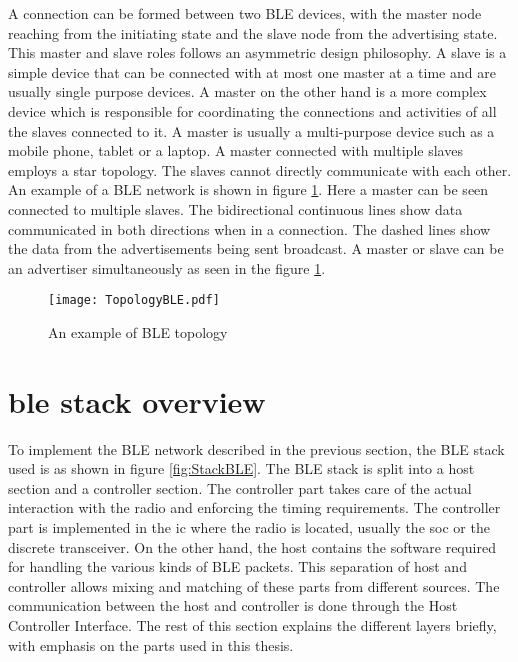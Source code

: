 A connection can be formed between two BLE devices, with the master node reaching from the initiating state and the slave node from the advertising state. This master and slave roles follows an asymmetric design philosophy. A slave is a simple device that can be connected with at most one master at a time and are usually single purpose devices. A master on the other hand is a more complex device which is responsible for coordinating the connections and activities of all the slaves connected to it. A master is usually a multi-purpose device such as a mobile phone, tablet or a laptop. A master connected with multiple slaves employs a star topology. The slaves cannot directly communicate with each other. An example of a BLE network is shown in figure \ref{fig:TopoBLE}. Here a master can be seen connected to multiple slaves. The bidirectional continuous lines show data communicated in both directions when in a connection. The dashed lines show the data from the advertisements being sent broadcast. A master or slave can be an advertiser simultaneously as seen in the figure \ref{fig:TopoBLE}.  

\begin{figure}[h]
\centering
\texttt{[image: TopologyBLE.pdf]}
\caption{An example of BLE topology}
\label{fig:TopoBLE}
\end{figure}


\section[\gls{ble} stack overview]{\gls{ble} stack overview\cite{Heydon2012}}

To implement the BLE network described in the previous section, the BLE stack used is as shown in figure \ref{fig:StackBLE}. The BLE stack is split into a host section and a controller section. The controller part takes care of the actual interaction with the radio and enforcing the timing requirements. The controller part is implemented in the \gls{ic} where the radio is located, usually the \gls{soc} or the discrete transceiver. On the other hand, the host contains the software required for handling the various kinds of BLE packets. This separation of host and controller allows mixing and matching of these parts from different sources. The communication between the host and controller is done through the Host Controller Interface. The rest of this section explains the different layers briefly, with emphasis on the parts used in this thesis.

